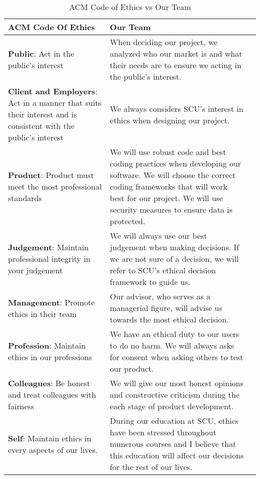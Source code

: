  \begin{center}
 \begin{table}%
 \caption{ACM Code of Ethics vs Our Team}\label{ethicsAnalysis}
 \begin{tabularx}{\textwidth}{|X|X|>{\hsize=1.5\hsize}X|} 
 \hline
 ACM Code Of Ethics & Our Team  \\ 
 \hline
 \textbf{Public}: Act in the public's interest & When deciding our project, we analyzed who our market is and what their needs are to ensure we acting in the public’s interest. \\ 
 \hline
 \textbf{Client and Employers}: Act in a manner that suits their interest and is consistent with the public’s interest & We always considers SCU’s interest in ethics when designing our project.  \\
 \hline
 \textbf{Product}: Product must meet the most professional standards & We will use robust code and best coding practices when developing our software. We will choose the correct coding frameworks that will work best for our project. We will use security measures to ensure data is protected. \\
 \hline
 \textbf{Judgement}: Maintain professional integrity in your judgement & We will always use our best judgement when making decisions. If we are not sure of a decision, we will refer to SCU’s ethical decision framework to guide us. \\
 \hline
 \textbf{Management}: Promote ethics in their team  & Our advisor, who serves as a managerial figure, will advise us towards the most ethical decision. \\
 \hline
 \textbf{Profession}: Maintain ethics in our professions & We have an ethical duty to our users to do no harm. We will always asks for consent when asking others to test our product. \\
 \hline
 \textbf{Colleagues}: Be honest and treat colleagues with fairness   & We will give our most honest opinions and constructive criticism during the each stage of product development. \\
 \hline
 \textbf{Self}: Maintain ethics in every aspects of our lives. & During our education at SCU, ethics have been stressed throughout numerous courses and I believe that this education will affect our decisions for the rest of our lives. \\
 \hline
\end{tabularx}
\end{table}%
\end{center}

